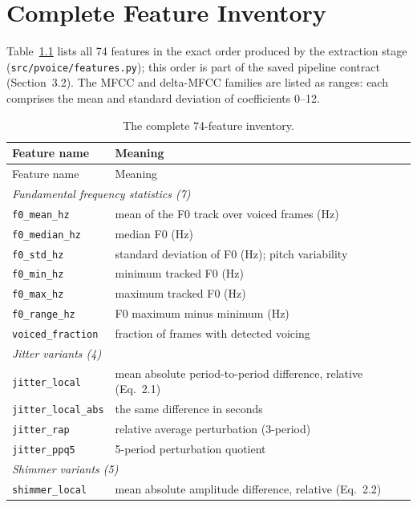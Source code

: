 \chapter{Complete Feature Inventory}
\label{app:features}

Table~\ref{tab:inventory} lists all 74 features in the exact order
produced by the extraction stage (\texttt{src/pvoice/features.py});
this order is part of the saved pipeline contract
(Section~3.2). The MFCC and delta-MFCC families are listed as ranges:
each comprises the mean and standard deviation of coefficients 0--12.

\begin{longtable}{p{4.4cm} p{9.6cm}}
\caption{The complete 74-feature inventory.}
\label{tab:inventory}\\
\toprule
Feature name & Meaning \\
\midrule
\endfirsthead
\toprule
Feature name & Meaning \\
\midrule
\endhead
\multicolumn{2}{l}{\emph{Fundamental frequency statistics (7)}}\\
\texttt{f0\_mean\_hz}    & mean of the F0 track over voiced frames (Hz) \\
\texttt{f0\_median\_hz}  & median F0 (Hz) \\
\texttt{f0\_std\_hz}     & standard deviation of F0 (Hz); pitch variability \\
\texttt{f0\_min\_hz}     & minimum tracked F0 (Hz) \\
\texttt{f0\_max\_hz}     & maximum tracked F0 (Hz) \\
\texttt{f0\_range\_hz}   & F0 maximum minus minimum (Hz) \\
\texttt{voiced\_fraction} & fraction of frames with detected voicing \\
\midrule
\multicolumn{2}{l}{\emph{Jitter variants (4)}}\\
\texttt{jitter\_local}     & mean absolute period-to-period difference, relative (Eq.~2.1) \\
\texttt{jitter\_local\_abs} & the same difference in seconds \\
\texttt{jitter\_rap}       & relative average perturbation (3-period) \\
\texttt{jitter\_ppq5}      & 5-period perturbation quotient \\
\midrule
\multicolumn{2}{l}{\emph{Shimmer variants (5)}}\\
\texttt{shimmer\_local}    & mean absolute amplitude difference, relative (Eq.~2.2) \\

\end{longtable}
